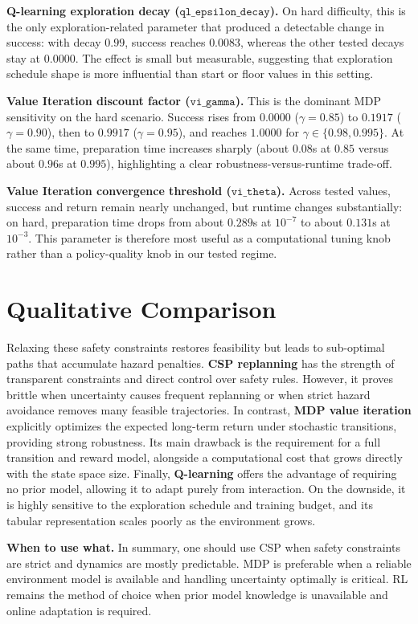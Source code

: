 \documentclass[letterpaper]{article} %
\begin{document}
\textbf{Q-learning exploration decay ($\texttt{ql\_epsilon\_decay}$).}
On hard difficulty, this is the only exploration-related parameter that produced a detectable change in success: with decay $0.99$, success reaches $0.0083$, whereas the other tested decays stay at $0.0000$. The effect is small but measurable, suggesting that exploration schedule shape is more influential than start or floor values in this setting.

\textbf{Value Iteration discount factor ($\texttt{vi\_gamma}$).}
This is the dominant MDP sensitivity on the hard scenario. Success rises from $0.0000$ ($\gamma=0.85$) to $0.1917$ ($\gamma=0.90$), then to $0.9917$ ($\gamma=0.95$), and reaches $1.0000$ for $\gamma\in\{0.98,0.995\}$. At the same time, preparation time increases sharply (about $0.08$s at $0.85$ versus about $0.96$s at $0.995$), highlighting a clear robustness-versus-runtime trade-off.

\textbf{Value Iteration convergence threshold ($\texttt{vi\_theta}$).}
Across tested values, success and return remain nearly unchanged, but runtime changes substantially: on hard, preparation time drops from about $0.289$s at $10^{-7}$ to about $0.131$s at $10^{-3}$. This parameter is therefore most useful as a computational tuning knob rather than a policy-quality knob in our tested regime.

\section{Qualitative Comparison}Relaxing these safety constraints restores feasibility but leads to sub-optimal paths that accumulate hazard penalties. 
\textbf{CSP replanning} has the strength of transparent constraints and direct control over safety rules. However, it proves brittle when uncertainty causes frequent replanning or when strict hazard avoidance removes many feasible trajectories. In contrast, \textbf{MDP value iteration} explicitly optimizes the expected long-term return under stochastic transitions, providing strong robustness. Its main drawback is the requirement for a full transition and reward model, alongside a computational cost that grows directly with the state space size. Finally, \textbf{Q-learning} offers the advantage of requiring no prior model, allowing it to adapt purely from interaction. On the downside, it is highly sensitive to the exploration schedule and training budget, and its tabular representation scales poorly as the environment grows.

\textbf{When to use what.}
In summary, one should use CSP when safety constraints are strict and dynamics are mostly predictable. MDP is preferable when a reliable environment model is available and handling uncertainty optimally is critical. RL remains the method of choice when prior model knowledge is unavailable and online adaptation is required.
\end{document}
